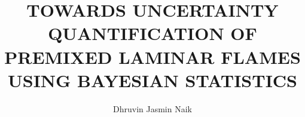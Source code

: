 \documentclass[10pt]{ubthesis}
\title{TOWARDS UNCERTAINTY QUANTIFICATION OF PREMIXED LAMINAR FLAMES USING BAYESIAN STATISTICS}
\author{Dhruvin Jasmin Naik}
\begin{document}
\begin{titlepage}
\maketitle
\end{titlepage}

\begin{ubfrontmatter}
\makecopyright
\cleardoublepage
\begin{acknowledgements}
  \doublespacing
  
\end{acknowledgements}

\singlespacing
\tableofcontents

\cleardoublepage
\listoffigures
\cleardoublepage
\listoftables
\cleardoublepage

\begin{abstract}

\end{abstract}
\end{ubfrontmatter}

\doublespacing





%






\begin{ubbackmatter}

\end{ubbackmatter}
\end{document}
